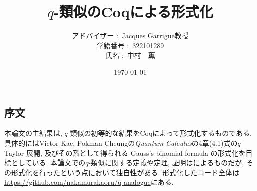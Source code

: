 \documentclass[11pt]{jsreport}
\theoremstyle{mystyle}
\newcommand{\0}{\textbf{0}}
\newcommand{\1}{\textbf{1}}
\newcommand{\2}{\textbf{2}}
\begin{document}
\title{$q$-類似のCoqによる形式化}
\author{アドバイザー $\colon$ Jacques Garrigue教授\\
           学籍番号 $\colon$ 322101289\\
           氏名 $\colon$ 中村　薫}
\date{\today}
\maketitle
\tableofcontents
\subsection*{序文}
本論文の主結果は, $q$-類似の初等的な結果をCoqによって形式化するものである. 具体的にはVictor Kac, Pokman Cheungの{\it Quantum Calculus}\cite{Kac}の4章(4.1)式の$q$-Taylor 展開, 及びその系として得られる Gauss's binomial formula の形式化を目標としている. 
本論文での$q$-類似に関する定義や定理, 証明は\cite{Kac}によるものだが, その形式化を行ったという点において独自性がある. 形式化したコード全体は\url{https://github.com/nakamurakaoru/q-analogue}\cite{coq qana}にある.
\end{document}

